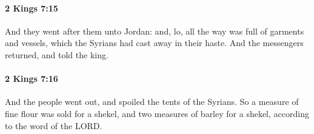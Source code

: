 		\paragraph{2 Kings 7:15} %
			\label{2KINGS-7-15}

			And they went after them unto Jordan: and, lo, all the way was full of garments and vessels, which the Syrians had cast away in their haste. And the messengers returned, and told the king.


		\paragraph{2 Kings 7:16} %
			\label{2KINGS-7-16}

			And the people went out, and spoiled the tents of the Syrians. So a measure of fine flour was sold for a shekel, and two measures of barley for a shekel, according to the word of the LORD.

